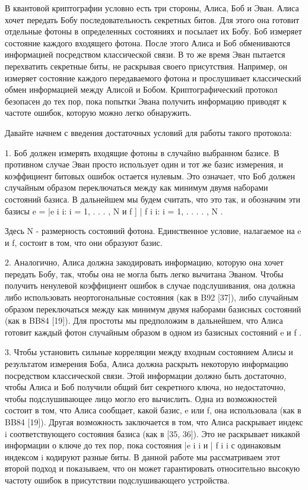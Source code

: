 В квантовой криптографии условно есть три стороны, Алиса, Боб и Эван. Алиса хочет передать Бобу последовательность секретных битов. Для этого она готовит отдельные фотоны в определенных состояниях и посылает их Бобу. Боб измеряет состояние каждого входящего фотона. После этого Алиса и Боб обмениваются информацией посредством классической связи. В то же время Эван пытается перехватить секретные биты, не раскрывая своего присутствия. Например, он измеряет состояние каждого передаваемого фотона и прослушивает классический обмен информацией между Алисой и Бобом. Криптографический протокол безопасен до тех пор, пока попытки Эвана получить информацию приводят к частоте ошибок, которую можно легко обнаружить.

Давайте начнем с введения достаточных условий для работы такого протокола:

1. Боб должен измерять входящие фотоны в случайно выбранном базисе. В противном случае Эван просто использует один и тот же базис измерения, и коэффициент битовых ошибок остается нулевым. Это означает, что Боб должен случайным образом переключаться между как минимум двумя наборами состояний базиса. В дальнейшем мы будем считать, что это так, и обозначим эти базисы e = {|e i i: i = 1, . . . , N } и f ] {| f i i: i = 1, . . . . , N }.

Здесь N - размерность состояний фотона. Единственное условие, налагаемое на e и f, состоит в том, что они образуют базис.

2. Аналогично, Алиса должна закодировать информацию, которую она хочет передать Бобу, так, чтобы она не могла быть легко вычитана Эваном. Чтобы получить ненулевой коэффициент ошибок в случае подслушивания, она должна либо использовать неортогональные состояния (как в B92 [37]), либо случайным образом переключаться между как минимум двумя наборами базисных состояний (как в BB84 [19]). Для простоты мы предположим в дальнейшем, что Алиса готовит каждый фотон случайным образом в одном из базисных состояний e и f .

3. Чтобы установить сильные корреляции между входным состоянием Алисы и результатом измерения Боба, Алиса должна раскрыть некоторую информацию посредством классической связи. Этой информации должно быть достаточно, чтобы Алиса и Боб получили общий бит секретного ключа, но недостаточно, чтобы подслушивающее лицо могло его вычислить. Одна из возможностей состоит в том, что Алиса сообщает, какой базис, e или f, она использовала (как в BB84 [19]). Другая возможность заключается в том, что Алиса раскрывает индекс i соответствующего состояния базиса (как в [35, 36]). Это не раскрывает никакой информации о ключе до тех пор, пока состояния |e i i и | f i i с одинаковым индексом i кодируют разные биты. В данной работе мы рассматриваем этот второй подход и показываем, что он может гарантировать относительно высокую частоту ошибок в присутствии подслушивающего устройства.

